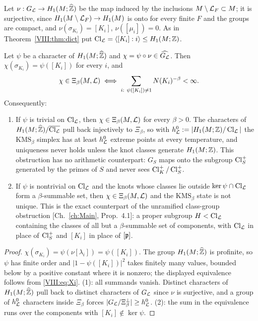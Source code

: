 Let $\nu:G_{\mathcal{L}}\to H_1(M;\widehat{\mathbb{Z}})$ be the map induced by the inclusions $M\setminus\mathcal{L}_F\subset M$;
it is surjective, since $H_1(M\setminus\mathcal{L}_F)\to H_1(M)$ is onto for every finite $F$ and the
groups are compact, and $\nu(\sigma_{K_i})=[K_i]$, $\nu([\mu_i])=0$. As in
Theorem~\ref{VIII:thm:dict} put $\operatorname{Cl}_{\mathcal{L}}=\langle[K_i]:i\rangle\le H_1(M;\mathbb{Z})$.

\begin{theorem}\label{VIII:thm:ambient}
Let $\psi$ be a character of $H_1(M;\widehat{\mathbb{Z}})$ and $\chi=\psi\circ\nu\in\widehat{G_{\mathcal{L}}}$. Then
$\chi(\sigma_{K_i})=\psi([K_i])$ for every $i$, and
\[
\chi\in\Xi_\beta(M,\cL)\iff\sum_{i:\ \psi([K_i])\ne1}N(K_i)^{-\beta}<\infty .
\]
Consequently:
\begin{enumerate}
\item If $\psi$ is trivial on $\operatorname{Cl}_{\mathcal{L}}$, then $\chi\in\Xi_\beta(M,\mathcal{L})$ for every $\beta>0$.
The characters of $H_1(M;\widehat{\mathbb{Z}})/\overline{\operatorname{Cl}_{\mathcal{L}}}$ pull back injectively to $\Xi_\beta$, so
with $h^0_{\mathcal{L}}:=|H_1(M;\mathbb{Z})/\operatorname{Cl}_{\mathcal{L}}|$ the $\mathrm{KMS}_\beta$ simplex has at least $h^0_{\mathcal{L}}$
extreme points at every temperature, and uniqueness never holds unless the knot classes
generate $H_1(M;\mathbb{Z})$. This obstruction has no arithmetic counterpart: $G_S$ maps onto the
subgroup $\operatorname{Cl}^+_S$ generated by the primes of $S$ and never sees $\operatorname{Cl}^+_K/\operatorname{Cl}^+_S$.
\item If $\psi$ is nontrivial on $\operatorname{Cl}_{\mathcal{L}}$ and the knots whose classes lie outside
$\ker\psi\cap\operatorname{Cl}_{\mathcal{L}}$ form a $\beta$-summable set, then $\chi\in\Xi_\beta(M,\mathcal{L})$ and the
$\mathrm{KMS}_\beta$ state is not unique. This is the exact counterpart of the unramified
class-group obstruction [Ch.~\ref{ch:Main}, Prop.~4.1]: a proper subgroup $H<\operatorname{Cl}_{\mathcal{L}}$ containing the
classes of all but a $\beta$-summable set of components, with $\operatorname{Cl}_{\mathcal{L}}$ in place of $\operatorname{Cl}^+_S$
and $[K_i]$ in place of $[\mathfrak{p}]$.
\end{enumerate}
\end{theorem}

\begin{proof}
$\chi(\sigma_{K_i})=\psi(\nu[\lambda_i])=\psi([K_i])$. The group $H_1(M;\widehat{\mathbb{Z}})$ is profinite,
so $\psi$ has finite order and $|1-\psi([K_i])|^2$ takes finitely many values, bounded below
by a positive constant where it is nonzero; the displayed equivalence follows from
\eqref{VIII:eq:Xi}. (1): all summands vanish. Distinct characters of
$H_1(M;\widehat{\mathbb{Z}})$ pull back to distinct characters of $G_{\mathcal{L}}$ since $\nu$ is surjective, and a
group of $h^0_{\mathcal{L}}$ characters inside $\Xi_\beta$ forces $|G_{\mathcal{L}}/\Xi_\beta^\perp|\ge h^0_{\mathcal{L}}$.
(2): the sum in the equivalence runs over the components with $[K_i]\notin\ker\psi$.
\end{proof}

